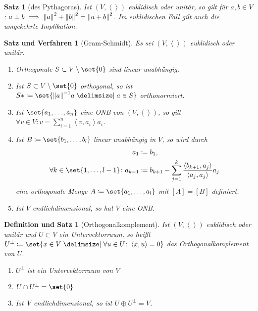 \documentclass[a4paper]{article}
\theoremstyle{marginbreak}
\newtheorem{satz}[definition]{Satz}
\newtheorem{defsatz}[definition]{Definition und Satz}
\newtheorem{satzver}[definition]{Satz und Verfahren}
\newcommand\scp[1]{\left\langle#1\right\rangle}
\begin{document}
	\begin{satz}[des Pythagoras]
		Ist $(V, \scp{})$ euklidisch oder unitär, so gilt für $a, b\in V$: $a\perp b\implies \norm{a}^2 + \norm{b}^2 = \norm{a+b}^2$.
		Im euklidischen Fall gilt auch die umgekehrte Implikation.
	\end{satz}
	\begin{satzver}[Gram-Schmidt]
		Es sei $(V, \scp{})$ euklidisch oder unitär.
		\begin{enumerate}[label=(\alph*)]
			\item Orthogonale $S\subset V\setminus\set{0}$ sind linear unabhängig.
			\item Ist $S\subset V\setminus\set{0}$ orthogonal, so ist
				$S*\coloneqq\set{\norm{a}^{-1}a\given a\in S}$ orthonormiert.
			\item Ist $\set{a_1,\ldots,a_n}$ eine ONB von $(V,\scp{})$, so gilt
				$\forall v\in V\colon v = \sum_{i=1}^n\scp{v,a_i}a_i$.
			\item Ist $B\coloneqq \set{b_1,\ldots,b_l}$ linear unabhängig in $V$, so wird durch
				\begin{align*}
					a_1 &\coloneqq b_1,\\
					\forall k\in\set{1,\ldots,l - 1}\colon a_{k+1} &\coloneqq b_{k+1} - \sum_{j=1}^k\frac{\scp{b_{k+1}, a_j}}{\scp{a_j, a_j}}a_j
				\end{align*}
				eine orthogonale Menge $A\coloneqq\set{a_1,\ldots,a_l}$ mit $[A] = [B]$ definiert.
			\item Ist $V$ endlichdimensional, so hat $V$ eine ONB.
		\end{enumerate}
	\end{satzver}
	\begin{defsatz}[Orthogonalkomplement]
		Ist $(V, \scp{})$ euklidisch oder unitär und $U\subset V$ ein Untervektorraum, so heißt
		$U^\perp \coloneqq\set{x\in V\given\forall u\in U\colon\scp{x, u}=0}$ das Orthogonalkomplement
		von $U$.
		\begin{enumerate}[label=(\alph*)]
			\item $U^\perp$ ist ein Untervektorraum von $V$
			\item $U\cap U^\perp=\set{0}$
			\item Ist V endlichdimensional, so ist $U\oplus U^\perp = V$.
		\end{enumerate}
	\end{defsatz}
\end{document}
